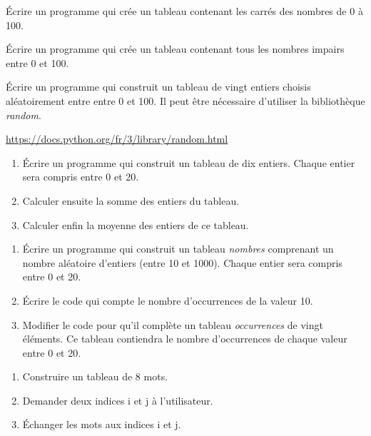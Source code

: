 \documentclass[a4paper,11pt]{article}
\begin{document}
\begin{Form}
\begin{exo}
Écrire un programme qui crée un tableau contenant les carrés des nombres de 0 à 100.
\end{exo}
\begin{exo}
Écrire un programme qui crée un tableau contenant tous les nombres impairs entre 0 et 100.
\end{exo}
\begin{exo}
Écrire un programme qui construit un tableau  de vingt entiers choisis aléatoirement entre entre 0 et 100. Il peut être nécessaire d'utiliser la bibliothèque \emph{random}.
\begin{center}
\url{https://docs.python.org/fr/3/library/random.html}
\end{center}
\end{exo}
\begin{exo}
\begin{enumerate}
\item Écrire un programme qui construit un tableau de dix entiers. Chaque entier sera compris entre 0 et 20.
\item Calculer ensuite la somme des entiers du tableau.
\item Calculer enfin la moyenne des entiers de ce tableau.
\end{enumerate}
\end{exo}
\begin{exo}
\begin{enumerate}
\item Écrire un programme qui construit un tableau \emph{nombres} comprenant un nombre aléatoire d'entiers (entre 10 et 1000). Chaque entier sera compris entre 0 et 20.
\item Écrire le code qui compte le nombre d'occurrences de la valeur 10.
\item Modifier le code pour qu'il complète un tableau \emph{occurrences} de vingt éléments. Ce tableau contiendra le nombre d'occurrences de chaque valeur entre 0 et 20.
\end{enumerate}
\end{exo}
\begin{exo}
\begin{enumerate}
\item Construire un tableau de 8 mots.
\item Demander deux indices i et j à l'utilisateur.
\item Échanger les mots aux indices i et j.
\end{enumerate}

\end{exo}
\end{Form}
\end{document}
